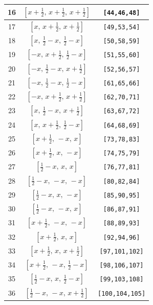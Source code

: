\documentclass[fleqn,8pt]{jsarticle}
\begin{document}
\begin{longtable}{ccc}
16 & $\left[ x + \frac{1}{2},\, x + \frac{1}{2},\, x + \frac{1}{2} \right]$ & {\tt [44,46,48]} \\ \hline
17 & $\left[ x,\, x + \frac{1}{2},\, x + \frac{1}{2} \right]$ & {\tt [49,53,54]} \\ \hline
18 & $\left[ x,\, \frac{1}{2} - x,\, \frac{1}{2} - x \right]$ & {\tt [50,58,59]} \\ \hline
19 & $\left[ - x,\, x + \frac{1}{2},\, \frac{1}{2} - x \right]$ & {\tt [51,55,60]} \\ \hline
20 & $\left[ - x,\, \frac{1}{2} - x,\, x + \frac{1}{2} \right]$ & {\tt [52,56,57]} \\ \hline
21 & $\left[ - x,\, \frac{1}{2} - x,\, \frac{1}{2} - x \right]$ & {\tt [61,65,66]} \\ \hline
22 & $\left[ - x,\, x + \frac{1}{2},\, x + \frac{1}{2} \right]$ & {\tt [62,70,71]} \\ \hline
23 & $\left[ x,\, \frac{1}{2} - x,\, x + \frac{1}{2} \right]$ & {\tt [63,67,72]} \\ \hline
24 & $\left[ x,\, x + \frac{1}{2},\, \frac{1}{2} - x \right]$ & {\tt [64,68,69]} \\ \hline
25 & $\left[ x + \frac{1}{2},\, - x,\, x \right]$ & {\tt [73,78,83]} \\ \hline
26 & $\left[ x + \frac{1}{2},\, x,\, - x \right]$ & {\tt [74,75,79]} \\ \hline
27 & $\left[ \frac{1}{2} - x,\, x,\, x \right]$ & {\tt [76,77,81]} \\ \hline
28 & $\left[ \frac{1}{2} - x,\, - x,\, - x \right]$ & {\tt [80,82,84]} \\ \hline
29 & $\left[ \frac{1}{2} - x,\, x,\, - x \right]$ & {\tt [85,90,95]} \\ \hline
30 & $\left[ \frac{1}{2} - x,\, - x,\, x \right]$ & {\tt [86,87,91]} \\ \hline
31 & $\left[ x + \frac{1}{2},\, - x,\, - x \right]$ & {\tt [88,89,93]} \\ \hline
32 & $\left[ x + \frac{1}{2},\, x,\, x \right]$ & {\tt [92,94,96]} \\ \hline
33 & $\left[ x + \frac{1}{2},\, x,\, x + \frac{1}{2} \right]$ & {\tt [97,101,102]} \\ \hline
34 & $\left[ x + \frac{1}{2},\, - x,\, \frac{1}{2} - x \right]$ & {\tt [98,106,107]} \\ \hline
35 & $\left[ \frac{1}{2} - x,\, x,\, \frac{1}{2} - x \right]$ & {\tt [99,103,108]} \\ \hline
36 & $\left[ \frac{1}{2} - x,\, - x,\, x + \frac{1}{2} \right]$ & {\tt [100,104,105]} \\ \hline

\end{longtable}
\end{document}
